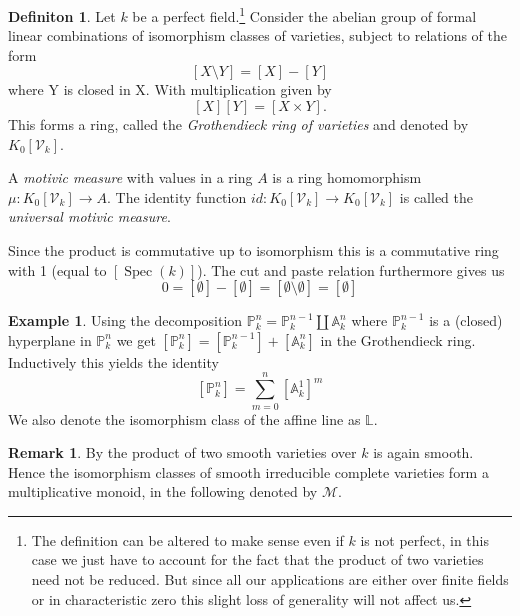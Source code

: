\documentclass[11pt, a4paper, german]{article}
\theoremstyle{plain}
\theoremstyle{definition}
\newtheorem{definition}[theorem]{Definiton}
\newtheorem{remark}[theorem]{Remark}
\newtheorem{example}[theorem]{Example}
\newcommand{\gring}[1][k]{K_0[\mathcal{V}_#1]}
\DeclareMathOperator{\spec}{Spec}
\begin{document}
\begin{definition}
    Let $k$ be a perfect field.\footnote{The definition can be altered to make sense even if $k$ is not perfect, 
    in this case we just have to account for the fact that the product of two varieties need not be reduced. 
    But since all our applications are either over finite fields or in characteristic zero this slight loss of generality will not affect us.}
    Consider the abelian group of formal linear combinations of isomorphism classes of varieties, subject to relations of the form
    \[
        [X \setminus Y] = [X] - [Y]
    \] where Y is closed in X.
    With multiplication given by
    \[
        [X][Y] = [X \times Y].
    \]
    This forms a ring, called the \emph{Grothendieck ring of varieties} and denoted by $\gring$. 
    
    A \emph{motivic measure} with values in a ring $A$ is a ring homomorphism $\mu \colon \gring \to A$. The identity function
    $id \colon \gring \to \gring$ is called the \emph{universal motivic measure}.
\end{definition}

Since the product is commutative up to isomorphism this is a commutative ring with 1 (equal to $[\spec(k)]$). 
The cut and paste relation furthermore gives us
\[
    0 = [\emptyset] - [\emptyset] = [\emptyset \setminus \emptyset] = [\emptyset]
\]


\begin{example}
    \label{projSum}
    Using the decomposition $\mathbb{P}_k^n = \mathbb{P}_k^{n-1} \coprod \mathbb{A}_k^n$ where $\mathbb{P}_k^{n-1}$ is a (closed) hyperplane
    in $\mathbb{P}_k^n$  we get $[\mathbb{P}_k^n] = [\mathbb{P}_k^{n-1}] + [\mathbb{A}_k^n]$ in the Grothendieck ring.
    Inductively this yields the identity 
    \[
        [\mathbb{P}_k^n] = \sum_{m=0}^n [\mathbb{A}_k^1]^m
    \]
    We also denote the isomorphism class of the affine line as $\mathbb{L}$.
\end{example}

\begin{remark}
    By \cite[Prop. 10.1 (d)]{Ha} the product of two smooth varieties over $k$ is again smooth. Hence the isomorphism classes of smooth
    irreducible complete varieties form a multiplicative monoid, in the following denoted by $\mathcal{M}$.
\end{remark}
\end{document}
